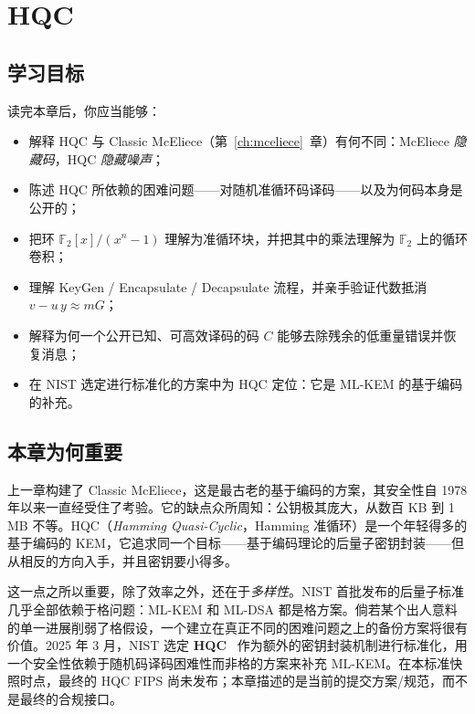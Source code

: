 \chapter{HQC}
\label{ch:hqc}

\section{学习目标}

读完本章后，你应当能够：

\begin{itemize}
  \item 解释 HQC 与 Classic McEliece（第~\ref{ch:mceliece}~章）有何不同：McEliece \emph{隐藏码}，HQC \emph{隐藏噪声}；
  \item 陈述 HQC 所依赖的困难问题——对随机准循环码译码——以及为何码本身是公开的；
  \item 把环 $\mathbb{F}_2[x]/(x^n-1)$ 理解为准循环块，并把其中的乘法理解为 $\mathbb{F}_2$ 上的循环卷积；
  \item 理解 KeyGen / Encapsulate / Decapsulate 流程，并亲手验证代数抵消 $v - u\,y \approx mG$；
  \item 解释为何一个公开已知、可高效译码的码 $C$ 能够去除残余的低重量错误并恢复消息；
  \item 在 NIST 选定进行标准化的方案中为 HQC 定位：它是 ML-KEM 的基于编码的补充。
\end{itemize}

\section{本章为何重要}

上一章构建了 Classic McEliece，这是最古老的基于编码的方案，其安全性自 1978 年以来一直经受住了考验。它的缺点众所周知：公钥极其庞大，从数百 KB 到 1 MB 不等。HQC（\emph{Hamming Quasi-Cyclic}，Hamming 准循环）是一个年轻得多的基于编码的 KEM，它追求同一个目标——基于编码理论的后量子密钥封装——但从相反的方向入手，并且密钥要小得多。

这一点之所以重要，除了效率之外，还在于\emph{多样性}。NIST 首批发布的后量子标准几乎全部依赖于格问题：ML-KEM 和 ML-DSA 都是格方案。倘若某个出人意料的单一进展削弱了格假设，一个建立在真正不同的困难问题之上的备份方案将很有价值。2025 年 3 月，NIST 选定 \textbf{HQC}~\cite{hqc2017} 作为额外的密钥封装机制进行标准化，用一个安全性依赖于随机码译码困难性而非格的方案来补充 ML-KEM。在本标准快照时点，最终的 HQC FIPS 尚未发布；本章描述的是当前的提交方案/规范，而不是最终的合规接口。

